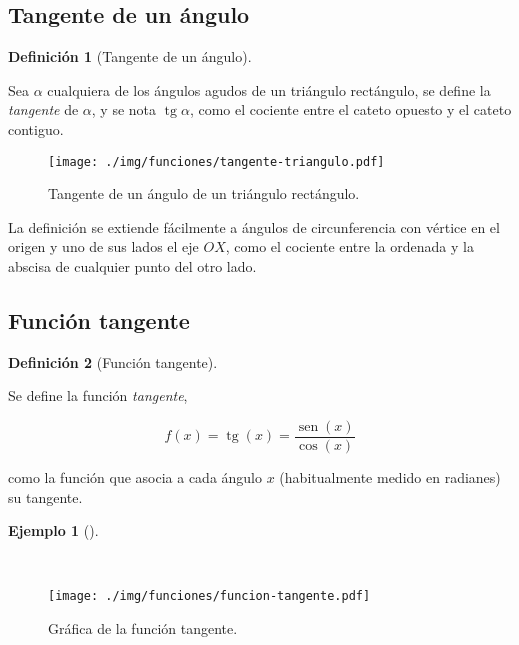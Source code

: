 \documentclass[
  a4paper,
]{scrreport}
\theoremstyle{plain}
\theoremstyle{definition}
\theoremstyle{plain}
\theoremstyle{plain}
\theoremstyle{definition}
\newtheorem{example}{Ejemplo}[chapter]
\theoremstyle{definition}
\newtheorem{definition}{Definición}[chapter]
\theoremstyle{remark}
\begin{document}
\subsection{Tangente de un ángulo}\label{tangente-de-un-uxe1ngulo}

\begin{definition}[Tangente de un
ángulo]\protect\hypertarget{def-tangente-angulo}{}\label{def-tangente-angulo}

Sea \(\alpha\) cualquiera de los ángulos agudos de un triángulo
rectángulo, se define la \emph{tangente} de \(\alpha\), y se nota
\(\operatorname{tg} \alpha\), como el cociente entre el cateto opuesto y
el cateto contiguo.

\end{definition}

\begin{figure}[H]

{\centering \texttt{[image: ./img/funciones/tangente-triangulo.pdf]}

}

\caption{Tangente de un ángulo de un triángulo rectángulo.}

\end{figure}%

La definición se extiende fácilmente a ángulos de circunferencia con
vértice en el origen y uno de sus lados el eje \(OX\), como el cociente
entre la ordenada y la abscisa de cualquier punto del otro lado.

\subsection{Función tangente}\label{funciuxf3n-tangente}

\begin{definition}[Función
tangente]\protect\hypertarget{def-funcion-tangente}{}\label{def-funcion-tangente}

Se define la función \emph{tangente},

\[f(x)=\operatorname{tg}(x)=\frac{\operatorname{sen}(x)}{\cos(x)}\]

como la función que asocia a cada ángulo \(x\) (habitualmente medido en
radianes) su tangente.

\end{definition}

\begin{example}[]\protect\hypertarget{exm-funcion-tangente}{}\label{exm-funcion-tangente}

~

\begin{figure}[H]

{\centering \texttt{[image: ./img/funciones/funcion-tangente.pdf]}

}

\caption{Gráfica de la función tangente.}

\end{figure}%

\end{example}
\end{document}
